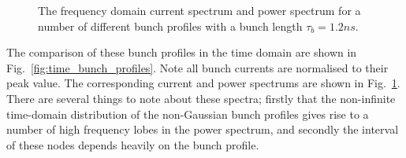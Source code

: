 \documentclass{cernyrep}
\begin{document}
\begin{figure}
\caption{The frequency domain  current spectrum and  power spectrum for a number of different bunch profiles with a bunch length $\tau_{b} = 1.2ns$.}
\label{fig:freq_dom_prof}
\end{figure}

The comparison of these bunch profiles in the time domain are shown in Fig.~\ref{fig:time_bunch_profiles}. Note all bunch currents are normalised to their peak value. The corresponding current and power spectrums are shown in Fig.~\ref{fig:freq_dom_prof}. There are several things to note about these spectra; firstly that the non-infinite time-domain distribution of the non-Gaussian bunch profiles gives rise to a number of high frequency lobes in the power spectrum, and secondly the interval of these nodes depends heavily on the bunch profile.
\end{document}
